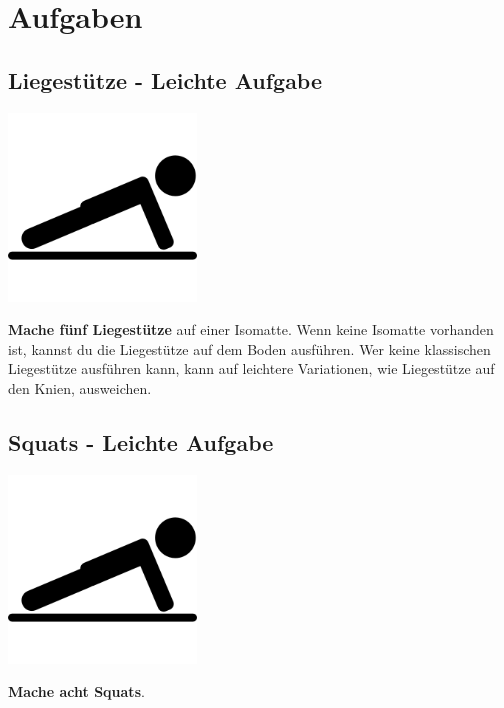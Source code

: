 \section{Aufgaben}
\newpage
\subsection{Liegestütze - Leichte Aufgabe}
\vfill
\begin{center}
    \includegraphics[height=5cm]{graphics/push_up.png}
\end{center}
\vfill
\textbf{Mache fünf Liegestütze} auf einer Isomatte.
Wenn keine Isomatte vorhanden ist, kannst du die Liegestütze auf dem Boden
ausführen.
Wer keine klassischen Liegestütze ausführen kann, kann auf leichtere
Variationen, wie Liegestütze auf den Knien, ausweichen.
\newpage

\subsection{Squats - Leichte Aufgabe}
\vfill
\begin{center}
    \includegraphics[height=5cm]{graphics/push_up.png}
    \end{center}
\vfill
\textbf{Mache acht Squats}.
\newline
\newpage

